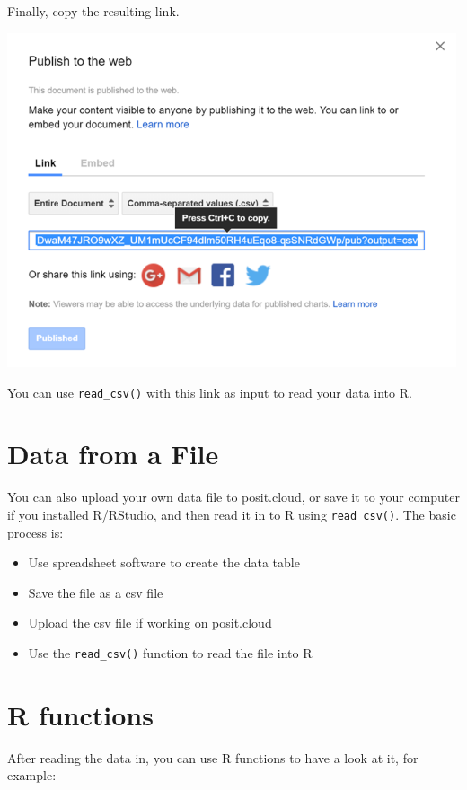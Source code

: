 \documentclass[
  letterpaper,
  DIV=11,
  numbers=noendperiod]{scrreprt}
\providecommand{\tightlist}{%
  \setlength{\itemsep}{0pt}\setlength{\parskip}{0pt}}\usepackage{longtable,booktabs,array}
\theoremstyle{remark}
\begin{document}
Finally, copy the resulting link.

\includegraphics[width=5.20833in,height=\textheight,keepaspectratio]{images/get-link.png}

You can use \texttt{read\_csv()} with this link as input to read your
data into R.

\section{Data from a File}\label{data-from-a-file}

You can also upload your own data file to posit.cloud, or save it to
your computer if you installed R/RStudio, and then read it in to R using
\texttt{read\_csv()}. The basic process is:

\begin{itemize}
\tightlist
\item
  Use spreadsheet software to create the data table
\item
  Save the file as a csv file
\item
  Upload the csv file if working on posit.cloud
\item
  Use the \texttt{read\_csv()} function to read the file into R
\end{itemize}

\section{R functions}\label{r-functions}

After reading the data in, you can use R functions to have a look at it,
for example:
\end{document}
